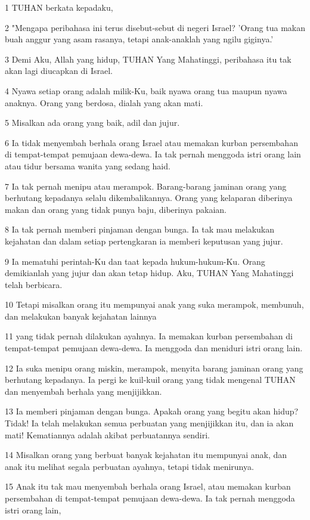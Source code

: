 \par 1 TUHAN berkata kepadaku,
\par 2 "Mengapa peribahasa ini terus disebut-sebut di negeri Israel? 'Orang tua makan buah anggur yang asam rasanya, tetapi anak-anaklah yang ngilu giginya.'
\par 3 Demi Aku, Allah yang hidup, TUHAN Yang Mahatinggi, peribahasa itu tak akan lagi diucapkan di Israel.
\par 4 Nyawa setiap orang adalah milik-Ku, baik nyawa orang tua maupun nyawa anaknya. Orang yang berdosa, dialah yang akan mati.
\par 5 Misalkan ada orang yang baik, adil dan jujur.
\par 6 Ia tidak menyembah berhala orang Israel atau memakan kurban persembahan di tempat-tempat pemujaan dewa-dewa. Ia tak pernah menggoda istri orang lain atau tidur bersama wanita yang sedang haid.
\par 7 Ia tak pernah menipu atau merampok. Barang-barang jaminan orang yang berhutang kepadanya selalu dikembalikannya. Orang yang kelaparan diberinya makan dan orang yang tidak punya baju, diberinya pakaian.
\par 8 Ia tak pernah memberi pinjaman dengan bunga. Ia tak mau melakukan kejahatan dan dalam setiap pertengkaran ia memberi keputusan yang jujur.
\par 9 Ia mematuhi perintah-Ku dan taat kepada hukum-hukum-Ku. Orang demikianlah yang jujur dan akan tetap hidup. Aku, TUHAN Yang Mahatinggi telah berbicara.
\par 10 Tetapi misalkan orang itu mempunyai anak yang suka merampok, membunuh, dan melakukan banyak kejahatan lainnya
\par 11 yang tidak pernah dilakukan ayahnya. Ia memakan kurban persembahan di tempat-tempat pemujaan dewa-dewa. Ia menggoda dan meniduri istri orang lain.
\par 12 Ia suka menipu orang miskin, merampok, menyita barang jaminan orang yang berhutang kepadanya. Ia pergi ke kuil-kuil orang yang tidak mengenal TUHAN dan menyembah berhala yang menjijikkan.
\par 13 Ia memberi pinjaman dengan bunga. Apakah orang yang begitu akan hidup? Tidak! Ia telah melakukan semua perbuatan yang menjijikkan itu, dan ia akan mati! Kematiannya adalah akibat perbuatannya sendiri.
\par 14 Misalkan orang yang berbuat banyak kejahatan itu mempunyai anak, dan anak itu melihat segala perbuatan ayahnya, tetapi tidak menirunya.
\par 15 Anak itu tak mau menyembah berhala orang Israel, atau memakan kurban persembahan di tempat-tempat pemujaan dewa-dewa. Ia tak pernah menggoda istri orang lain,

